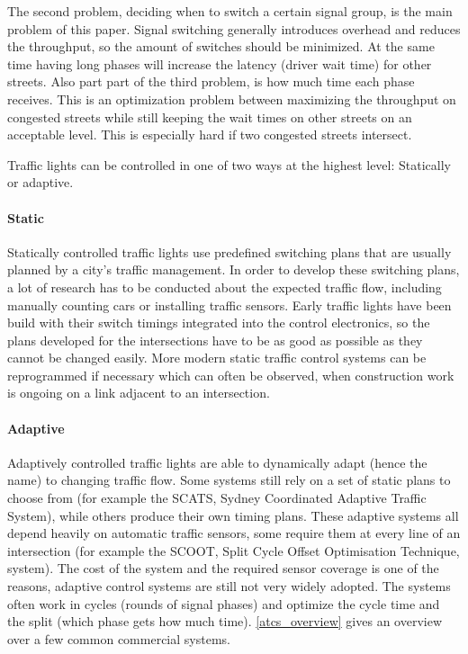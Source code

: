 The second problem, deciding when to switch a certain signal group, is the main problem of this paper. Signal switching generally introduces overhead and reduces the throughput, so the amount of switches should be minimized. At the same time having long phases will increase the latency (driver wait time) for other streets. Also part part of the third problem, is how much time each phase receives. This is an optimization problem between maximizing the throughput on congested streets while still keeping the wait times on other streets on an acceptable level. This is especially hard if two congested streets intersect.

Traffic lights can be controlled in one of two ways at the highest level: Statically or adaptive.

\paragraph{Static} Statically controlled traffic lights use predefined switching plans that are usually planned by a city's traffic management. In order to develop these switching plans, a lot of research has to be conducted about the expected traffic flow, including manually counting cars or installing traffic sensors. Early traffic lights have been build with their switch timings integrated into the control electronics, so the plans developed for the intersections have to be as good as possible as they cannot be changed easily. More modern static traffic control systems can be reprogrammed if necessary which can often be observed, when construction work is ongoing on a link adjacent to an intersection.

\paragraph{Adaptive} Adaptively controlled traffic lights are able to dynamically adapt (hence the name) to changing traffic flow. Some systems still rely on a set of static plans to choose from (for example the SCATS, Sydney Coordinated Adaptive Traffic System), while others produce their own timing plans. These adaptive systems all depend heavily on automatic traffic sensors, some require them at every line of an intersection (for example the SCOOT, Split Cycle Offset Optimisation Technique, system). The cost of the system and the required sensor coverage is one of the reasons, adaptive control systems are still not very widely adopted. The systems often work in cycles (rounds of signal phases) and optimize the cycle time and the split (which phase gets how much time). \autoref{atcs_overview} gives an overview over a few common commercial systems. \cite{atcs_overview}

